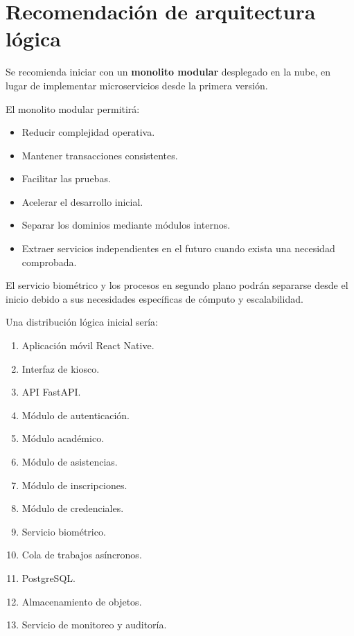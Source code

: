 \documentclass[12pt,a4paper]{article}
\begin{document}
\section{Recomendación de arquitectura lógica}

Se recomienda iniciar con un \textbf{monolito modular} desplegado en la nube,
en lugar de implementar microservicios desde la primera versión.

El monolito modular permitirá:

\begin{itemize}[leftmargin=*]
\item Reducir complejidad operativa.
\item Mantener transacciones consistentes.
\item Facilitar las pruebas.
\item Acelerar el desarrollo inicial.
\item Separar los dominios mediante módulos internos.
\item Extraer servicios independientes en el futuro cuando exista una necesidad
comprobada.
\end{itemize}

El servicio biométrico y los procesos en segundo plano podrán separarse desde el
inicio debido a sus necesidades específicas de cómputo y escalabilidad.

Una distribución lógica inicial sería:

\begin{enumerate}[leftmargin=*]
\item Aplicación móvil React Native.
\item Interfaz de kiosco.
\item API FastAPI.
\item Módulo de autenticación.
\item Módulo académico.
\item Módulo de asistencias.
\item Módulo de inscripciones.
\item Módulo de credenciales.
\item Servicio biométrico.
\item Cola de trabajos asíncronos.
\item PostgreSQL.
\item Almacenamiento de objetos.
\item Servicio de monitoreo y auditoría.
\end{enumerate}
\end{document}
